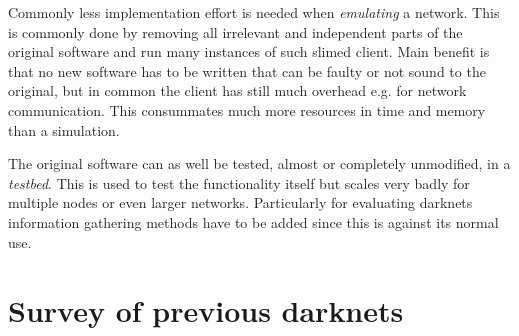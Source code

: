 Commonly less implementation effort is needed when \emph{emulating} a network. This is commonly done by removing all irrelevant and independent parts of the original software and run many instances of such slimed client. Main benefit is that no new software has to be written that can be faulty or not sound to the original, but in common the client has still much overhead e.g. for network communication. This consummates much more resources in time and memory than a simulation.

The original software can as well be tested, almost or completely unmodified, in a \emph{testbed}. This is used to test the functionality itself but scales very badly for multiple nodes or even larger networks. Particularly for evaluating darknets information gathering methods have to be added since this is against its normal use.

\section{Survey of previous darknets}


